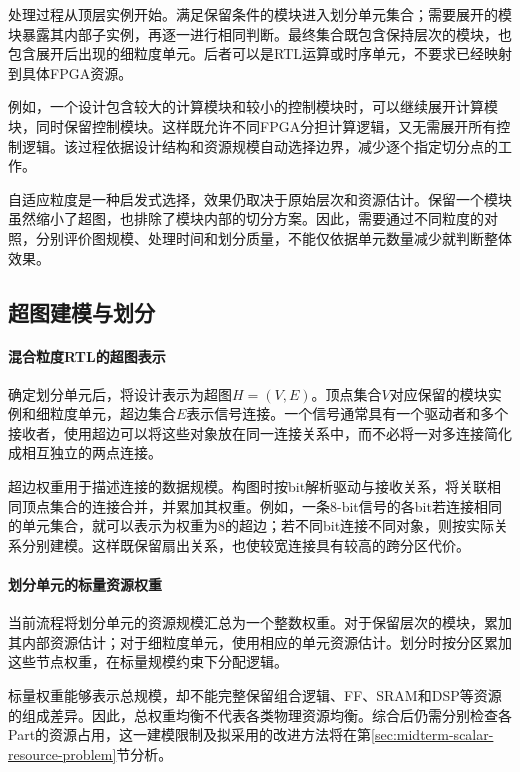 处理过程从顶层实例开始。满足保留条件的模块进入划分单元集合；需要展开的模块暴露其内部子实例，再逐一进行相同判断。最终集合既包含保持层次的模块，也包含展开后出现的细粒度单元。后者可以是RTL运算或时序单元，不要求已经映射到具体FPGA资源。

例如，一个设计包含较大的计算模块和较小的控制模块时，可以继续展开计算模块，同时保留控制模块。这样既允许不同FPGA分担计算逻辑，又无需展开所有控制逻辑。该过程依据设计结构和资源规模自动选择边界，减少逐个指定切分点的工作。

自适应粒度是一种启发式选择，效果仍取决于原始层次和资源估计。保留一个模块虽然缩小了超图，也排除了模块内部的切分方案。因此，需要通过不同粒度的对照，分别评价图规模、处理时间和划分质量，不能仅依据单元数量减少就判断整体效果。


\subsection{超图建模与划分}
\label{sec:midterm-hypergraph-partitioning}

\paragraph{混合粒度RTL的超图表示}

确定划分单元后，将设计表示为超图$H=(V,E)$。顶点集合$V$对应保留的模块实例和细粒度单元，超边集合$E$表示信号连接。一个信号通常具有一个驱动者和多个接收者，使用超边可以将这些对象放在同一连接关系中，而不必将一对多连接简化成相互独立的两点连接。

超边权重用于描述连接的数据规模。构图时按bit解析驱动与接收关系，将关联相同顶点集合的连接合并，并累加其权重。例如，一条8-bit信号的各bit若连接相同的单元集合，就可以表示为权重为8的超边；若不同bit连接不同对象，则按实际关系分别建模。这样既保留扇出关系，也使较宽连接具有较高的跨分区代价。

\paragraph{划分单元的标量资源权重}

当前流程将划分单元的资源规模汇总为一个整数权重。对于保留层次的模块，累加其内部资源估计；对于细粒度单元，使用相应的单元资源估计。划分时按分区累加这些节点权重，在标量规模约束下分配逻辑。

标量权重能够表示总规模，却不能完整保留组合逻辑、FF、SRAM和DSP等资源的组成差异。因此，总权重均衡不代表各类物理资源均衡。综合后仍需分别检查各Part的资源占用，这一建模限制及拟采用的改进方法将在第\ref{sec:midterm-scalar-resource-problem}节分析。

